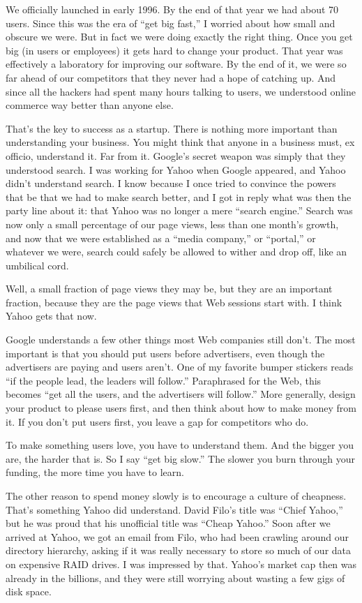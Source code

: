 \documentclass[12pt]{book}
\begin{document}
We officially launched in early 1996. By the end of that year we had
about 70 users. Since this was the era of ``get big fast,'' I worried
about how small and obscure we were. But in fact we were doing exactly
the right thing. Once you get big (in users or employees) it gets hard
to change your product. That year was effectively a laboratory for
improving our software. By the end of it, we were so far ahead of our
competitors that they never had a hope of catching up. And since all the
hackers had spent many hours talking to users, we understood online
commerce way better than anyone else.

That's the key to success as a startup. There is nothing more important
than understanding your business. You might think that anyone in a
business must, ex officio, understand it. Far from it. Google's secret
weapon was simply that they understood search. I was working for Yahoo
when Google appeared, and Yahoo didn't understand search. I know because
I once tried to convince the powers that be that we had to make search
better, and I got in reply what was then the party line about it: that
Yahoo was no longer a mere ``search engine.'' Search was now only a
small percentage of our page views, less than one month's growth, and
now that we were established as a ``media company,'' or ``portal,'' or
whatever we were, search could safely be allowed to wither and drop off,
like an umbilical cord.

Well, a small fraction of page views they may be, but they are an
important fraction, because they are the page views that Web sessions
start with. I think Yahoo gets that now.

Google understands a few other things most Web companies still don't.
The most important is that you should put users before advertisers, even
though the advertisers are paying and users aren't. One of my favorite
bumper stickers reads ``if the people lead, the leaders will follow.''
Paraphrased for the Web, this becomes ``get all the users, and the
advertisers will follow.'' More generally, design your product to please
users first, and then think about how to make money from it. If you
don't put users first, you leave a gap for competitors who do.

To make something users love, you have to understand them. And the
bigger you are, the harder that is. So I say ``get big slow.'' The
slower you burn through your funding, the more time you have to learn.

The other reason to spend money slowly is to encourage a culture of
cheapness. That's something Yahoo did understand. David Filo's title was
``Chief Yahoo,'' but he was proud that his unofficial title was ``Cheap
Yahoo.'' Soon after we arrived at Yahoo, we got an email from Filo, who
had been crawling around our directory hierarchy, asking if it was
really necessary to store so much of our data on expensive RAID drives.
I was impressed by that. Yahoo's market cap then was already in the
billions, and they were still worrying about wasting a few gigs of disk
space.
\end{document}
